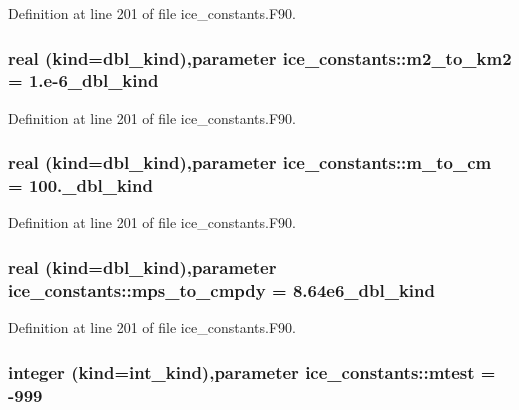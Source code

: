 Definition at line 201 of file ice\_\-constants.F90.\hypertarget{namespaceice__constants_adea1a32826f6ac5693ff2cff66098aef}{
\subsubsection[{m2\_\-to\_\-km2}]{\setlength{\rightskip}{0pt plus 5cm}real (kind=dbl\_\-kind),parameter {\bf ice\_\-constants::m2\_\-to\_\-km2} = 1.e-\/6\_\-dbl\_\-kind}}
\label{namespaceice__constants_adea1a32826f6ac5693ff2cff66098aef}


Definition at line 201 of file ice\_\-constants.F90.\hypertarget{namespaceice__constants_a3f01424bceae75ecd2f26cdf208a89f6}{
\subsubsection[{m\_\-to\_\-cm}]{\setlength{\rightskip}{0pt plus 5cm}real (kind=dbl\_\-kind),parameter {\bf ice\_\-constants::m\_\-to\_\-cm} = 100.\_\-dbl\_\-kind}}
\label{namespaceice__constants_a3f01424bceae75ecd2f26cdf208a89f6}


Definition at line 201 of file ice\_\-constants.F90.\hypertarget{namespaceice__constants_a0fed58f0622b835fd2cb734144ac46c7}{
\subsubsection[{mps\_\-to\_\-cmpdy}]{\setlength{\rightskip}{0pt plus 5cm}real (kind=dbl\_\-kind),parameter {\bf ice\_\-constants::mps\_\-to\_\-cmpdy} = 8.64e6\_\-dbl\_\-kind}}
\label{namespaceice__constants_a0fed58f0622b835fd2cb734144ac46c7}


Definition at line 201 of file ice\_\-constants.F90.\hypertarget{namespaceice__constants_a8da957fd440b5e1713582e19da3590cf}{
\subsubsection[{mtest}]{\setlength{\rightskip}{0pt plus 5cm}integer (kind=int\_\-kind),parameter {\bf ice\_\-constants::mtest} = -\/999}}
\label{namespaceice__constants_a8da957fd440b5e1713582e19da3590cf}


